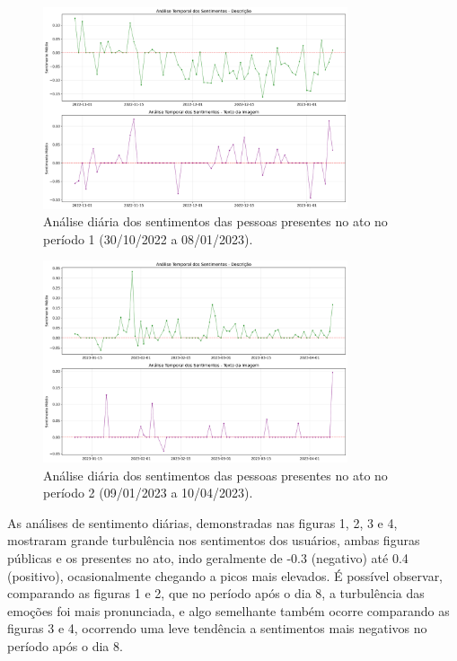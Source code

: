 \documentclass[manuscript,screen,review]{acmart}
\begin{document}
\begin{figure}[h]
\centering
\includegraphics[width=0.8\textwidth]{figura3_sentimentos_presentes_periodo1.png}
\caption{Análise diária dos sentimentos das pessoas presentes no ato no período 1 (30/10/2022 a 08/01/2023).}
\label{fig:figura3}
\end{figure}

\begin{figure}[h]
\centering
\includegraphics[width=0.8\textwidth]{figura4_sentimentos_presentes_periodo2.png}
\caption{Análise diária dos sentimentos das pessoas presentes no ato no período 2 (09/01/2023 a 10/04/2023).}
\label{fig:figura4}
\end{figure}

As análises de sentimento diárias, demonstradas nas figuras 1, 2, 3 e 4, mostraram grande turbulência nos sentimentos dos usuários, ambas figuras públicas e os presentes no ato, indo geralmente de -0.3 (negativo) até 0.4 (positivo), ocasionalmente chegando a picos mais elevados. É possível observar, comparando as figuras 1 e 2, que no período após o dia 8, a turbulência das emoções foi mais pronunciada, e algo semelhante também ocorre comparando as figuras 3 e 4, ocorrendo uma leve tendência a sentimentos mais negativos no período após o dia 8.
\end{document}
